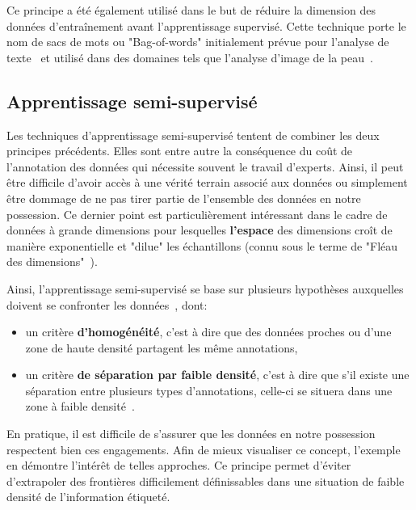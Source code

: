 Ce principe a été également utilisé dans le but de réduire la dimension des données d'entraînement avant l'apprentissage supervisé. Cette technique porte le nom de sacs de mots ou "Bag-of-words" initialement prévue pour l'analyse de texte~\cite{Zhang2010} et utilisé dans des domaines tels que l'analyse d'image de la peau~\cite{Situ2008}.\par

\subsection{Apprentissage semi-supervisé}
\label{sec:semisupervised_learning}
Les techniques d'apprentissage semi-supervisé tentent de combiner les deux principes précédents. Elles sont entre autre la conséquence du coût de l'annotation des données qui nécessite souvent le travail d'experts. Ainsi, il peut être difficile d'avoir accès à une vérité terrain associé aux données ou simplement être dommage de ne pas tirer partie de l'ensemble des données en notre possession. Ce dernier point est particulièrement intéressant dans le cadre de données à grande dimensions pour lesquelles \textbf{l'espace} des dimensions croît de manière exponentielle et "dilue" les échantillons (connu sous le terme de "Fléau des dimensions"~\cite{Donoho2000}).\par 

Ainsi, l'apprentissage semi-supervisé se base sur plusieurs hypothèses auxquelles doivent se confronter les données~\cite{Zhu2009}, dont:
\begin{itemize}
	\item un critère \textbf{d'homogénéité}, c'est à dire que des données proches ou d'une zone de haute densité partagent les même annotations, 
	\item un critère \textbf{de séparation par faible densité}, c'est à dire que s'il existe une  séparation entre plusieurs types d'annotations, celle-ci se situera dans une zone à faible densité~\cite{chapelle2005}.
\end{itemize}
En pratique, il est difficile de s'assurer que les données en notre possession respectent bien ces engagements. Afin de mieux visualiser ce concept, l'exemple en  démontre l'intérêt de telles approches. Ce principe permet d'éviter d'extrapoler des frontières difficilement définissables dans une situation de faible densité de l'information étiqueté.\par
 
